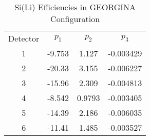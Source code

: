 \begin{table}[]
    \centering
    \caption{Si(Li) Efficiencies in GEORGINA Configuration}
    \begin{tabular}{c|c|c|c}
    \toprule
        Detector & $p_1$ & $p_2$ & $p_3$ \\
        1	&	-9.753	&	1.127	&	-0.003429	\\
        2	&	-20.33	&	3.155	&	-0.006227	\\
        3	&	-15.96	&	2.309	&	-0.004813	\\
        4	&	-8.542	&	0.9793	&	-0.003405	\\
        5	&	-14.39	&	2.186	&	-0.006035	\\
        6	&	-11.41	&	1.485	&	-0.003527	\\
        \bottomrule
    \end{tabular}
    \label{tab:sili_eff_georgina}
\end{table}